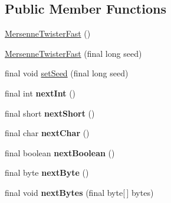 \subsection*{Public Member Functions}
\begin{DoxyCompactItemize}
\item 
\hyperlink{classjenes_1_1utils_1_1_mersenne_twister_fast_a7321af0f92bcda7c245ebfbb647f7e4c}{Mersenne\-Twister\-Fast} ()
\item 
\hyperlink{classjenes_1_1utils_1_1_mersenne_twister_fast_a554aee5d390bb57ad30577b194c8b7b2}{Mersenne\-Twister\-Fast} (final long seed)
\item 
final void \hyperlink{classjenes_1_1utils_1_1_mersenne_twister_fast_aa44ca1bf8e9a2f272e248ea279f1e80c}{set\-Seed} (final long seed)
\item 
\hypertarget{classjenes_1_1utils_1_1_mersenne_twister_fast_a063b45fa6e20a5eea9acbe45a8c48ce0}{final int {\bfseries next\-Int} ()}\label{classjenes_1_1utils_1_1_mersenne_twister_fast_a063b45fa6e20a5eea9acbe45a8c48ce0}

\item 
\hypertarget{classjenes_1_1utils_1_1_mersenne_twister_fast_a89d03c5b1815eff8c443ef081a869e78}{final short {\bfseries next\-Short} ()}\label{classjenes_1_1utils_1_1_mersenne_twister_fast_a89d03c5b1815eff8c443ef081a869e78}

\item 
\hypertarget{classjenes_1_1utils_1_1_mersenne_twister_fast_a8f7cb8ea9832581729660f5c0346ee3a}{final char {\bfseries next\-Char} ()}\label{classjenes_1_1utils_1_1_mersenne_twister_fast_a8f7cb8ea9832581729660f5c0346ee3a}

\item 
\hypertarget{classjenes_1_1utils_1_1_mersenne_twister_fast_a54fa48ab055886a90aefdcb816257f4b}{final boolean {\bfseries next\-Boolean} ()}\label{classjenes_1_1utils_1_1_mersenne_twister_fast_a54fa48ab055886a90aefdcb816257f4b}

\item 
\hypertarget{classjenes_1_1utils_1_1_mersenne_twister_fast_a5e7c0943fcc746a30277f0e09abbf60f}{final byte {\bfseries next\-Byte} ()}\label{classjenes_1_1utils_1_1_mersenne_twister_fast_a5e7c0943fcc746a30277f0e09abbf60f}

\item 
\hypertarget{classjenes_1_1utils_1_1_mersenne_twister_fast_a237dc55841fd8bf544106d052833c374}{final void {\bfseries next\-Bytes} (final byte\mbox{[}$\,$\mbox{]} bytes)}\label{classjenes_1_1utils_1_1_mersenne_twister_fast_a237dc55841fd8bf544106d052833c374}


\end{DoxyCompactItemize}
